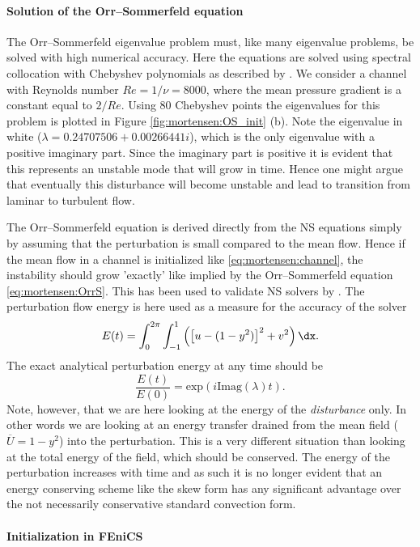 \paragraph{Solution of the Orr--Sommerfeld equation}

The Orr--Sommerfeld eigenvalue problem must, like many eigenvalue
problems, be solved with high numerical accuracy. Here the equations
are solved using spectral collocation with Chebyshev polynomials as
described by \citet{Trefethen2006}. We consider a channel with
Reynolds number $Re=1/\nu=8000$, where the mean pressure gradient is a
constant equal to $2/Re$. Using 80 Chebyshev points the eigenvalues
for this problem is plotted in Figure \ref{fig:mortensen:OS_init}
(b). Note the eigenvalue in white ($\lambda = 0.24707506+0.00266441
i$), which is the only eigenvalue with a positive imaginary
part. Since the imaginary part is positive it is evident that this
represents an unstable mode that will grow in time. Hence one might
argue that eventually this disturbance will become unstable and lead
to transition from laminar to turbulent flow.

The Orr--Sommerfeld equation is derived directly from the NS equations
simply by assuming that the perturbation is small compared to the mean
flow. Hence if the mean flow in a channel is initialized like
\eqref{eq:mortensen:channel}, the instability should grow 'exactly'
like implied by the Orr--Sommerfeld equation
\eqref{eq:mortensen:OrrS}. This has been used to validate NS solvers
by \citet{MalikZangHussaini1984}. The perturbation flow energy is here
used as a measure for the accuracy of the solver
\begin{equation}
  E(t)= \int_0^{2\pi}\int_{-1}^{1} \left( \left[u-(1-y^2)\right]^2 + v^2
	  \right) \dx.
\end{equation}
The exact analytical perturbation energy at any time should be
\[ \frac{E(t)}{E(0)}=\text{exp}(i \text{Imag}(\lambda) t).\]
Note, however, that we are here looking at the energy of the
\textit{disturbance} only. In other words we are looking at an energy
transfer drained from the mean field ($\overline{U}=1-y^2$) into the
perturbation. This is a very different situation than looking at the
total energy of the field, which should be conserved. The energy of
the perturbation increases with time and as such it is no longer
evident that an energy conserving scheme like the skew form has any
significant advantage over the not necessarily conservative standard
convection form.

\paragraph{Initialization in FEniCS}

